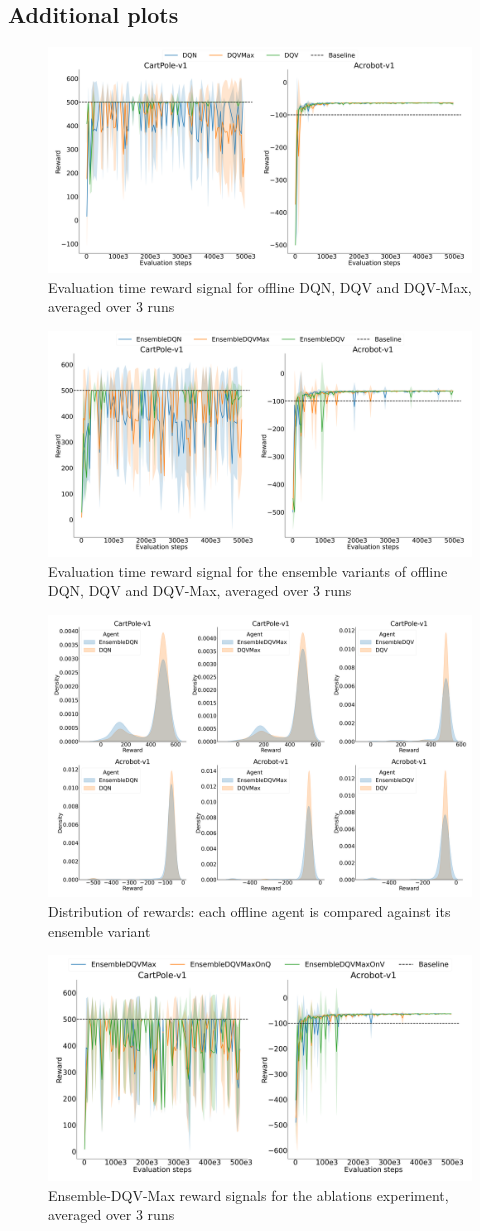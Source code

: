 \subsection{Additional plots}\label{sec:appendix_figs}
\begin{figure}[H]
  \centering
  \includegraphics[width=.5\textwidth]{img/dshift_plots_rwd.png}
  \caption{Evaluation time reward signal for offline DQN, DQV and
    DQV-Max, averaged over 3 runs}\label{fig:dshift_rwd}
\end{figure}

\begin{figure}[H]
  \centering
  \includegraphics[width=.5\textwidth]{img/dshift_plots_ensembles_rwd.png}
  \caption{Evaluation time reward signal for the ensemble variants of
    offline DQN, DQV and DQV-Max, averaged over 3
    runs}\label{fig:dshift_ensemble_rwd}
\end{figure}

\begin{figure}[H]
  \centering
  \includegraphics[width=.5\textwidth]{img/all_rwd_dist.png}
  \caption{Distribution of rewards: each offline agent is compared
    against its ensemble variant}\label{fig:rwd_dist}
\end{figure}

\begin{figure}[H]
  \centering
  \includegraphics[width=.5\textwidth]{img/dshift_plots_ablation_rwd.png}
  \caption{Ensemble-DQV-Max reward signals for the ablations
    experiment, averaged over 3 runs}\label{fig:dshift_rwd_ablation}
\end{figure}

